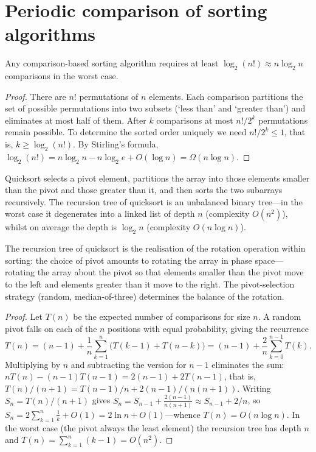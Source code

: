 \section{Periodic comparison of sorting algorithms}

\begin{theorem}\label{thm:sorting_lower_bound}
Any comparison-based sorting algorithm requires at least $\log_2(n!) \approx n \log_2 n$ comparisons in the worst case.
\end{theorem}

\begin{proof}
There are $n!$ permutations of $n$ elements. Each comparison partitions the set of possible permutations into two subsets (`less than' and `greater than') and eliminates at most half of them. After $k$ comparisons at most $n!/2^k$ permutations remain possible. To determine the sorted order uniquely we need $n!/2^k \le 1$, that is, $k \ge \log_2(n!)$. By Stirling's formula, $\log_2(n!) = n \log_2 n - n \log_2 e + O(\log n) = \Omega(n \log n)$.
\end{proof}

\begin{proposition}\label{prop:quicksort_cycle}
Quicksort selects a pivot element, partitions the array into those elements smaller than the pivot and those greater than it, and then sorts the two subarrays recursively. The recursion tree of quicksort is an unbalanced binary tree---in the worst case it degenerates into a linked list of depth $n$ (complexity $O(n^2)$), whilst on average the depth is $\log_2 n$ (complexity $O(n \log n)$).

The recursion tree of quicksort is the realisation of the rotation operation within sorting: the choice of pivot amounts to rotating the array in phase space---rotating the array about the pivot so that elements smaller than the pivot move to the left and elements greater than it move to the right. The pivot-selection strategy (random, median-of-three) determines the balance of the rotation.
\end{proposition}

\begin{proof}
Let $T(n)$ be the expected number of comparisons for size $n$. A random pivot falls on each of the $n$ positions with equal probability, giving the recurrence
\[
T(n) = (n-1) + \frac{1}{n}\sum_{k=1}^{n}\big( T(k-1) + T(n-k) \big)
= (n-1) + \frac{2}{n}\sum_{k=0}^{n-1} T(k).
\]
Multiplying by $n$ and subtracting the version for $n-1$ eliminates the sum: $nT(n) - (n-1)T(n-1) = 2(n-1) + 2T(n-1)$, that is, $T(n)/(n+1) = T(n-1)/n + 2(n-1)/(n(n+1))$. Writing $S_n = T(n)/(n+1)$ gives $S_n = S_{n-1} + \frac{2(n-1)}{n(n+1)} \approx S_{n-1} + 2/n$, so $S_n = 2\sum_{k=1}^{n} \frac{1}{k} + O(1) = 2\ln n + O(1)$---whence $T(n) = O(n\log n)$. In the worst case (the pivot always the least element) the recursion tree has depth $n$ and $T(n) = \sum_{k=1}^{n}(k-1) = O(n^2)$.
\end{proof}

